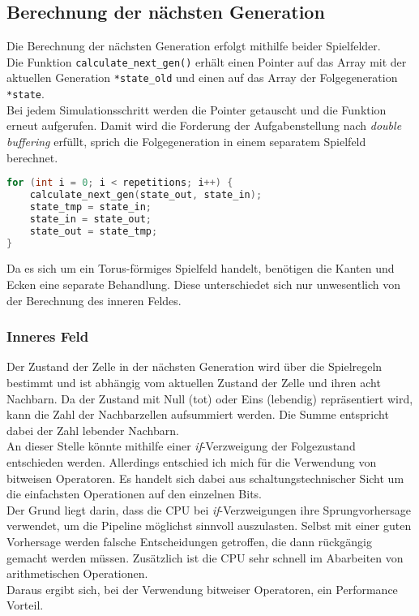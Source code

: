 \documentclass[german,plainarticle,hyperref,utf8]{zihpub}
\begin{document}
	\subsection{Berechnung der nächsten Generation}
	Die Berechnung der nächsten Generation erfolgt mithilfe beider Spielfelder.\\ Die Funktion \texttt{calculate\_next\_gen()} erhält einen Pointer auf das Array mit der aktuellen Generation \texttt{*state\_old} und einen auf das Array der Folgegeneration \texttt{*state}.\\
	Bei jedem Simulationsschritt werden die Pointer getauscht und die Funktion erneut aufgerufen. Damit wird die Forderung der Aufgabenstellung nach \textit{double buffering} erfüllt, sprich die Folgegeneration in einem separatem Spielfeld berechnet.
	\begin{lstlisting}[language=C, caption=Vertauschen der Pointer vor jedem Funktionsaufruf (vereinfacht)]
for (int i = 0; i < repetitions; i++) {
	calculate_next_gen(state_out, state_in);
	state_tmp = state_in;
	state_in = state_out;
	state_out = state_tmp;
}\end{lstlisting}
	Da es sich um ein Torus-förmiges Spielfeld handelt, benötigen die Kanten und Ecken eine separate Behandlung. Diese unterschiedet sich nur unwesentlich von der Berechnung des inneren Feldes.
	
	\subsubsection{Inneres Feld}
	Der Zustand der Zelle in der nächsten Generation wird über die Spielregeln bestimmt und ist abhängig vom aktuellen Zustand der Zelle und ihren acht Nachbarn. Da der Zustand mit Null (tot) oder Eins (lebendig) repräsentiert wird, kann die Zahl der Nachbarzellen aufsummiert werden. Die Summe entspricht dabei der Zahl lebender Nachbarn.\\
	An dieser Stelle könnte mithilfe einer \textit{if}-Verzweigung der Folgezustand entschieden werden. Allerdings entschied ich mich für die Verwendung von bitweisen Operatoren. Es handelt sich dabei aus schaltungstechnischer Sicht um die einfachsten Operationen auf den einzelnen Bits.\\
	Der Grund liegt darin, dass die CPU bei \textit{if}-Verzweigungen ihre Sprungvorhersage verwendet, um die Pipeline möglichst sinnvoll auszulasten. Selbst mit einer guten Vorhersage werden falsche Entscheidungen getroffen, die dann rückgängig gemacht werden müssen. Zusätzlich ist die CPU sehr schnell im Abarbeiten von arithmetischen Operationen.\\
	Daraus ergibt sich, bei der Verwendung bitweiser Operatoren, ein Performance Vorteil.\\
	
\end{document}
